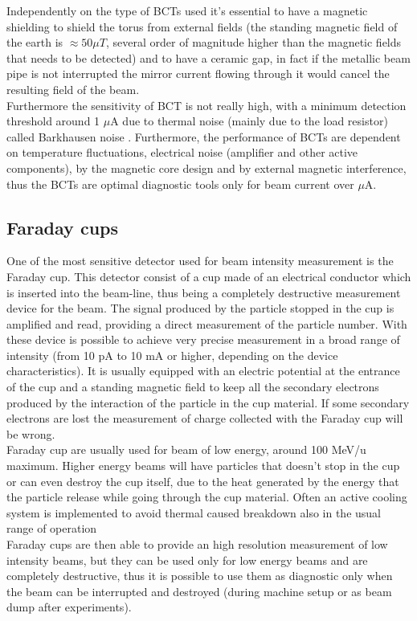 \documentclass[12pt,a4paper]{report}
\begin{document}
	Independently on the type of BCTs used it's essential to have a magnetic shielding to shield the torus from external fields (the standing magnetic field of the earth is $\approx 50 \mu T$, several order of magnitude higher than the magnetic fields that needs to be detected) and to have a ceramic gap, in fact if the metallic beam pipe is not interrupted the mirror current flowing through it would cancel the resulting field of the beam. \\
	Furthermore the sensitivity of BCT is not really high, with a minimum detection threshold around 1 $\mu$A due to thermal noise (mainly due to the load resistor) called Barkhausen noise \cite{Bk_noise}. Furthermore, the performance of BCTs are dependent on temperature fluctuations, electrical noise (amplifier and other active components), by the magnetic core design and by external magnetic interference, thus the BCTs are optimal diagnostic tools only for beam current over $\mu$A.
	\subsection{Faraday cups}
	One of the most sensitive detector used for beam intensity measurement is the Faraday cup. This detector consist of a cup made of an electrical conductor which is inserted into the beam-line, thus being a completely destructive measurement device for the beam. The signal produced by the particle stopped in the cup is amplified and read, providing a direct measurement of the particle number. With these device is possible to achieve very precise measurement in a broad range of intensity (from 10 pA to 10 mA or higher, depending on the device characteristics). It is usually equipped with an electric potential at the entrance of the cup and a standing magnetic field to keep all the secondary electrons produced by the interaction of the particle in the cup material. If some secondary electrons are lost the measurement of charge collected with the Faraday cup will be wrong. \\
	Faraday cup are usually used for beam of low energy, around 100 MeV/u maximum. Higher energy beams will have particles that doesn't stop in the cup or can even destroy the cup itself, due to the heat generated by the energy that the particle release while going through the cup material. Often an active cooling system is implemented to avoid thermal caused breakdown also in the usual range of operation\\
	Faraday cups are then able to provide an high resolution measurement of low intensity beams, but they can be used only for low energy beams and are completely destructive, thus it is possible to use them as diagnostic only when the beam can be interrupted and destroyed (during machine setup or as beam dump after experiments).\\
\end{document}
